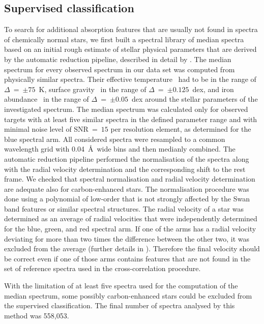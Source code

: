 \subsection{Supervised classification}
\label{sec:supervised}
To search for additional absorption features that are usually not found in spectra of chemically normal stars, we first built a spectral library of median spectra based on an initial rough estimate of stellar physical parameters that are derived by the automatic reduction pipeline, described in detail by \citet{2017MNRAS.464.1259K}. The median spectrum for every observed spectrum in our data set was computed from physically similar spectra. Their effective temperature \Teff\ had to be in the range of $\Delta$\Teff~=~$\pm75$~K, surface gravity \Logg\ in the range of $\Delta$\Logg~=~$\pm0.125$~dex, and iron abundance \Feh\ in the range of $\Delta$\Feh~=~$\pm0.05$~dex around the stellar parameters of the investigated spectrum. The median spectrum was calculated only for observed targets with at least five similar spectra in the defined parameter range and with minimal noise level of SNR~=~$15$ per resolution element, as determined for the blue spectral arm. All considered spectra were resampled to a common wavelength grid with 0.04~\AA\ wide bins and then medianly combined. The automatic reduction pipeline \cite{2017MNRAS.464.1259K} performed the normalisation of the spectra along with the radial velocity determination and the corresponding shift to the rest frame. We checked that spectral normalisation and radial velocity determination are adequate also for carbon-enhanced stars. The normalisation procedure was done using a polynomial of low-order that is not strongly affected by the Swan band features or similar spectral structures. The radial velocity of a star was determined as an average of radial velocities that were independently determined for the blue, green, and red spectral arm. If one of the arms has a radial velocity deviating for more than two times the difference between the other two, it was excluded from the average (further details in \citet{2017MNRAS.464.1259K}). Therefore the final velocity should be correct even if one of those arms contains features that are not found in the set of reference spectra used in the cross-correlation procedure.

With the limitation of at least five spectra used for the computation of the median spectrum, some possibly carbon-enhanced stars could be excluded from the supervised classification. The final number of spectra analysed by this method was 558,053.

